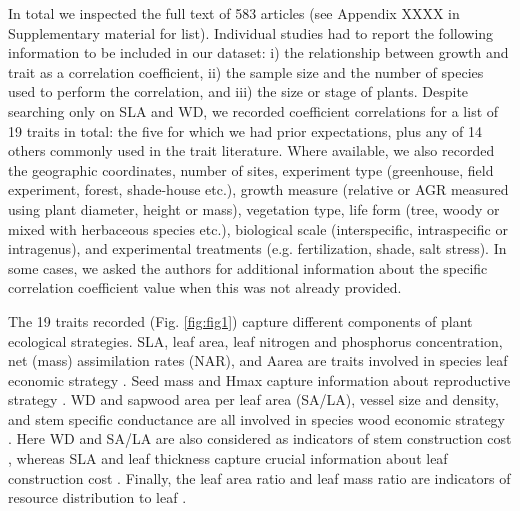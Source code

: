 \documentclass[a4paper,11pt]{article}
\begin{document}
In total we inspected the full text of 583 articles (see Appendix XXXX in Supplementary material for list). Individual studies had to report the following information to be included in our dataset: i) the relationship between growth and trait as a correlation coefficient, ii) the sample size and the number of species used to perform the correlation, and iii) the size or stage of plants. Despite searching only on SLA and WD, we recorded coefficient correlations for a list of 19 traits in total: the five for which we had prior expectations, plus any of 14 others commonly used in the trait literature. Where available, we also recorded the geographic coordinates, number of sites, experiment type (greenhouse, field experiment, forest, shade-house etc.), growth measure (relative or AGR measured using plant diameter, height or mass), vegetation type, life form (tree, woody or mixed with herbaceous species etc.), biological scale (interspecific, intraspecific or intragenus), and experimental treatments (e.g. fertilization, shade, salt stress). In some cases, we asked the authors for additional information about the specific correlation coefficient value when this was not already provided.

The 19 traits recorded (Fig. \ref{fig:fig1}) capture different components of plant ecological strategies. SLA, leaf area, leaf nitrogen and phosphorus concentration, net (mass) assimilation rates (NAR), and Aarea are traits involved in species leaf economic strategy \citep{Wright:2004jb,Wright:2010tp}. Seed mass and Hmax capture information about reproductive strategy \citep{Falster:2005bw,Moles:2006ft}. WD and sapwood area per leaf area (SA/LA), vessel size and density, and stem specific conductance are all involved in species wood economic strategy  \citep{Chave:2009iy}. Here WD and SA/LA are also considered as indicators of stem construction cost \citep{Falster:2011ii}, whereas SLA and leaf thickness capture crucial information about leaf construction cost \citep{Wright:2004jb}. Finally, the leaf area ratio and leaf mass ratio are indicators of resource distribution to leaf \citep{Lambers:1992bj}.
\end{document}
